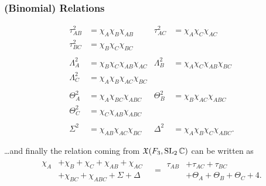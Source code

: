 \begin{frame}
\frametitle{(Binomial) Relations}
\begin{align*}
  \tau_{AB}^2&=\chi_A\chi_B\chi_{AB} &\tau_{AC}^2&=\chi_A\chi_C\chi_{AC}\\
  \tau_{BC}^2&=\chi_B\chi_C\chi_{BC}\\\\
  \Lambda_A^2&=\chi_B\chi_C\chi_{AB}\chi_{AC}
  &\Lambda_B^2&=\chi_A\chi_C\chi_{AB}\chi_{BC}\\
  \Lambda_C^2&=\chi_A\chi_B\chi_{AC}\chi_{BC}\\\\
  \Theta_A^2&=\chi_A\chi_{BC}\chi_{ABC}&\Theta_B^2&=\chi_B\chi_{AC}\chi_{ABC}\\
  \Theta_C^2&=\chi_C\chi_{AB}\chi_{ABC}\\\\
  \Sigma ^2&=\chi_{AB}\chi_{AC}\chi_{BC}&\Delta^2&=\chi_A\chi_B\chi_C\chi_{ABC}.
\end{align*}
\end{frame}

\begin{frame}
  \dots and finally the relation coming from $\mathfrak{X}(F_3,\operatorname{SL}_2\mathbb{C})$ can be
  written as
  \begin{align*}
    \begin{aligned}
      \chi_A&+\chi_B+\chi_C+\chi_{AB}+\chi_{AC}\\
      &+\chi_{BC}+\chi_{ABC}+\Sigma+\Delta
    \end{aligned}
    &=
      \begin{aligned}
        \tau_{AB}&+\tau_{AC}+\tau_{BC}\\&+\Theta_A+\Theta_B+\Theta_C+4.
      \end{aligned}
\end{align*}
\end{frame}

